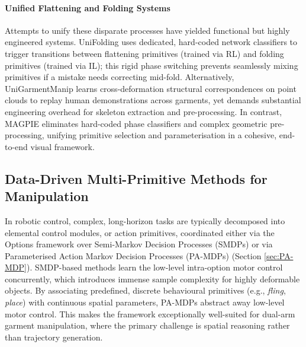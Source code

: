 \documentclass[journal]{IEEEtran}
\begin{document}
\paragraph{Unified Flattening and Folding Systems} Attempts to unify these disparate processes have yielded functional but highly engineered systems. UniFolding \cite{xue2023unifolding} uses dedicated, hard-coded network classifiers to trigger transitions between flattening primitives (trained via RL) and folding primitives (trained via IL); this rigid phase switching prevents seamlessly mixing primitives if a mistake needs correcting mid-fold. Alternatively, UniGarmentManip \cite{wu2024unigarmentmanip} learns cross-deformation structural correspondences on point clouds to replay human demonstrations across garments, yet demands substantial engineering overhead for skeleton extraction and pre-processing. In contrast, MAGPIE eliminates hard-coded phase classifiers and complex geometric pre-processing, unifying primitive selection and parameterisation in a cohesive, end-to-end visual framework.

\subsection{Data-Driven Multi-Primitive Methods for Manipulation}
\label{sec:multi_primitive_control}

In robotic control, complex, long-horizon tasks are typically decomposed into elemental control modules, or action primitives, coordinated either via the Options framework over Semi-Markov Decision Processes (SMDPs) \cite{sutton1999between} or via Parameterised Action Markov Decision Processes (PA-MDPs) \cite{masson2016reinforcement} (Section \ref{sec:PA-MDP}). SMDP-based methods learn the low-level intra-option motor control concurrently, which introduces immense sample complexity for highly deformable objects. By associating predefined, discrete behavioural primitives (e.g., \textit{fling}, \textit{place}) with continuous spatial parameters, PA-MDPs abstract away low-level motor control. This makes the framework exceptionally well-suited for dual-arm garment manipulation, where the primary challenge is spatial reasoning rather than trajectory generation.
\end{document}
